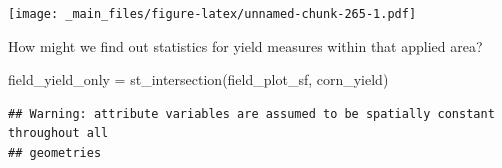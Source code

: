 \documentclass[
]{book}
\newenvironment{Shaded}{\begin{snugshade}}{\end{snugshade}}
\newcommand{\AttributeTok}[1]{\textcolor[rgb]{0.77,0.63,0.00}{#1}}
\newcommand{\DecValTok}[1]{\textcolor[rgb]{0.00,0.00,0.81}{#1}}
\newcommand{\FunctionTok}[1]{\textcolor[rgb]{0.00,0.00,0.00}{#1}}
\newcommand{\NormalTok}[1]{#1}
\newcommand{\OtherTok}[1]{\textcolor[rgb]{0.56,0.35,0.01}{#1}}
\newcommand{\SpecialCharTok}[1]{\textcolor[rgb]{0.00,0.00,0.00}{#1}}
\begin{document}
\begin{Shaded}
\end{Shaded}

\texttt{[image: \_main\_files/figure-latex/unnamed-chunk-265-1.pdf]}

How might we find out statistics for yield measures within that applied area?

\begin{Shaded}
\begin{Highlighting}[]
\NormalTok{field\_yield\_only }\OtherTok{=} \FunctionTok{st\_intersection}\NormalTok{(field\_plot\_sf, corn\_yield)}
\end{Highlighting}
\end{Shaded}

\begin{verbatim}
## Warning: attribute variables are assumed to be spatially constant throughout all
## geometries
\end{verbatim}
\end{document}
